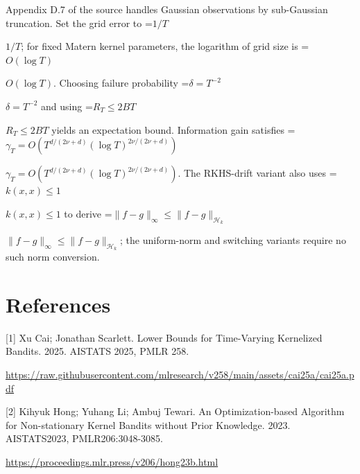 \documentclass[10pt,a4paper]{article}
\newcommand{\AtlasMath}[1]{\par\begingroup\centering\setbox0=\hbox{$\displaystyle #1$}\ifdim\wd0>1.4\linewidth\typeout{ATLAS WIDE FORMULA: \the\wd0}\fi\ifdim\wd0>\linewidth\resizebox{\linewidth}{!}{\box0}\else\box0\fi\par\endgroup}
\newcommand{\AtlasInlineMath}[1]{\begingroup\setbox0=\hbox{$#1$}\ifdim\wd0>.4\linewidth\endgroup\AtlasMath{#1}\else\endgroup$#1$\fi}
\begin{document}
Appendix D.7 of the source handles Gaussian observations by sub-Gaussian truncation. Set the grid error to \AtlasInlineMath{1/T}; for fixed Matern kernel parameters, the logarithm of grid size is \AtlasInlineMath{O(\log T)}. Choosing failure probability \AtlasInlineMath{\delta=T^{-2}} and using \AtlasInlineMath{R_T\le2BT} yields an expectation bound. Information gain satisfies \AtlasInlineMath{\gamma_T=O(T^{d/(2\nu+d)}(\log T)^{2\nu/(2\nu+d)})}. The RKHS-drift variant also uses \AtlasInlineMath{k(x,x)\le1} to derive \AtlasInlineMath{\|f-g\|_\infty\le\|f-g\|_{\mathcal H_k}}; the uniform-norm and switching variants require no such norm conversion.

\section{References}
[1] Xu Cai; Jonathan Scarlett. Lower Bounds for Time-Varying Kernelized Bandits. 2025. AISTATS 2025, PMLR 258.

\url{https://raw.githubusercontent.com/mlresearch/v258/main/assets/cai25a/cai25a.pdf}

[2] Kihyuk Hong; Yuhang Li; Ambuj Tewari. An Optimization-based Algorithm for Non-stationary Kernel Bandits without Prior Knowledge. 2023. AISTATS2023, PMLR206:3048-3085.

\url{https://proceedings.mlr.press/v206/hong23b.html}
\end{document}
